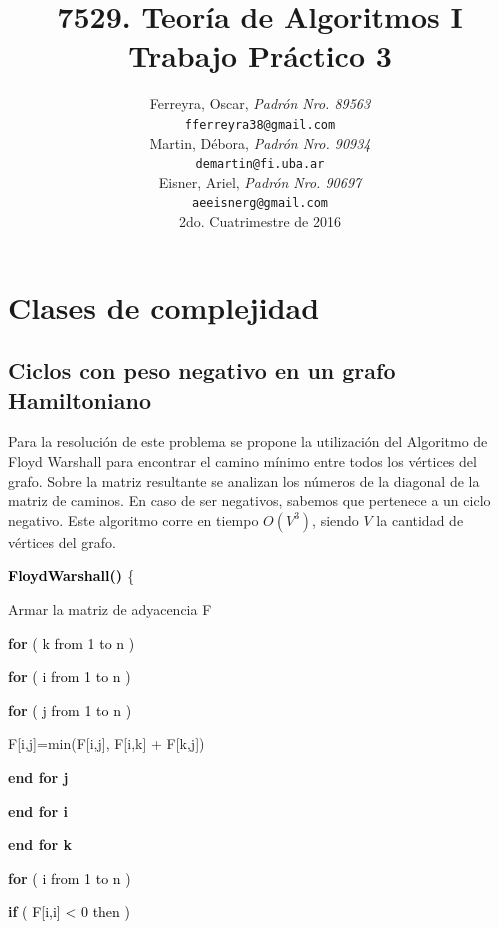\documentclass[a4paper,10pt]{article}
\title{
\textbf{ 
	7529. Teoría de Algoritmos I\\
	Trabajo Práctico 3
	}
}
\author{ Ferreyra, Oscar, \textit{Padrón Nro. 89563} \\
\texttt{ fferreyra38@gmail.com } \\[2.5ex]
Martin, Débora, \textit{Padrón Nro. 90934} \\
\texttt{ demartin@fi.uba.ar } \\[2.5ex]
Eisner, Ariel, \textit{Padrón Nro. 90697} \\
\texttt{ aeeisnerg@gmail.com } \\[2.5ex]
\normalsize{2do. Cuatrimestre de 2016} \\
}
\date{}
\begin{document}
\maketitle

\thispagestyle{empty} %
\setcounter{page}{0}
\newpage
\tableofcontents

\newpage

\section{Clases de complejidad}


\subsection{Ciclos con peso negativo en un grafo Hamiltoniano}
Para la resolución de este problema se propone la utilización del Algoritmo de Floyd Warshall para encontrar el camino mínimo entre todos los vértices del grafo. Sobre la matriz resultante se analizan los números de la diagonal de la matriz de caminos. En caso de ser negativos, sabemos que pertenece a un ciclo negativo. Este algoritmo corre en tiempo \( O( V^{3}) \), siendo \( V \) la cantidad de vértices del grafo.

\bigskip

\textbf{\textcolor[rgb]{0.4,0.4,0.4}{}\textcolor{black}{FloydWarshall() }} \{

\quad Armar la matriz de adyacencia F

\quad \textbf{\textcolor[rgb]{0.0,0.5019608,0.0}{for}}\textcolor{black}{ ( k from 1 to n )}

\quad \quad \textbf{\textcolor[rgb]{0.0,0.5019608,0.0}{for}}\textcolor{black}{ ( i from 1 to n )}

\quad \quad \quad \textbf{\textcolor[rgb]{0.0,0.5019608,0.0}{for}}\textcolor{black}{ ( j from 1 to n )}

\quad \quad \quad \quad F[i,j]=min(F[i,j], F[i,k] + F[k,j])

\quad \quad \quad \textbf{\textcolor[rgb]{0.0,0.5019608,0.0}{end for j}}

\quad \quad \textbf{\textcolor[rgb]{0.0,0.5019608,0.0}{end for i}}

\quad \textbf{\textcolor[rgb]{0.0,0.5019608,0.0}{end for k}}

\bigskip

\quad \textbf{\textcolor[rgb]{0.0,0.5019608,0.0}{for}}\textcolor{black}{ ( i from 1 to n )}

\quad \quad \textbf{\textcolor[rgb]{0.0,0.5019608,0.0}{if}}\textcolor{black}{ ( F[i,i] < 0 then )}
	
\end{document}
